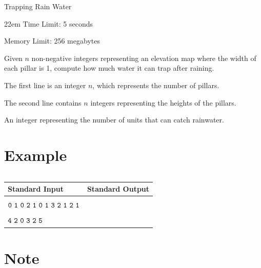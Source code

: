 \documentclass{xcpc}
\begin{document}
	\begin{problem}{Trapping Rain Water}
		\begin{boxedminipage}[c][1cm][t]{22em} 
			Time Limit: 5 seconds
			
			Memory Limit: 256 megabytes
		\end{boxedminipage}
		
		Given $n$ non-negative integers representing an elevation map where the width of each pillar is 1, compute how much water it can trap after raining.
		
		\begin{inputdes}
			The first line is an integer $n$, which represents the number of pillars.
			
			The second line contains $n$ integers representing the heights of the pillars.
		\end{inputdes}
		
		\begin{outputdes}
			An integer representing the number of units that can catch rainwater.
		\end{outputdes}

		\section*{Example}
		
		\begin{table}[h]
			\begin{tabular}{|l|l|}
				
			\end{tabular}
		\end{table}

		\begin{table}[h]
		\begin{tabularx}{\textwidth}{|>{\raggedright\arraybackslash}X|>{\raggedright\arraybackslash}X|}
			\hline
			\textbf{Standard Input} & \textbf{Standard Output} \\ \hline
			\makecell[l]{$\tt{12}$\\$\tt{0\ 1\ 0\ 2\ 1\ 0\ 1\ 3\ 2\ 1\ 2\ 1}$} & \makecell[l]{$\tt{6}$} \\ \hline
			\makecell[l]{$\tt{6}$\\$\tt{4\ 2\ 0\ 3\ 2\ 5}$} & \makecell[l]{$\tt{9}$} \\ \hline
		\end{tabularx}
	\end{table}
		
		\section*{Note}
		

\end{problem}
\end{document}
